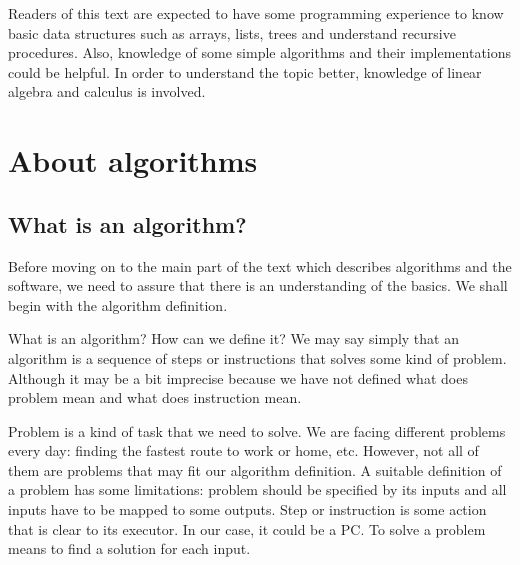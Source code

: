 \documentclass[
  field=inf,
  biblatex,
  language=english,
  glossaries,
  theorems=false,
  sourcecodes=false,
  index
]{kidiplom}
\begin{document}
Readers of this text are expected to have some programming experience to know basic data structures such as arrays, lists, trees and understand recursive procedures. Also, knowledge of some simple algorithms and their implementations could be helpful. In order to understand the topic better, knowledge of linear algebra and calculus is involved.

\newpage
\section{About algorithms}
\subsection{What is an algorithm?}

Before moving on to the main part of the text which describes algorithms and the software, we need to assure that there is an understanding of the basics. We shall begin with the algorithm definition.

What is an algorithm? How can we define it? We may say simply that an algorithm is a sequence of steps or instructions that solves some kind of problem. Although it may be a bit imprecise because we have not defined what does problem mean and what does instruction mean.

Problem is a kind of task that we need to solve. We are facing different problems every day: finding the fastest route to work or home, etc. However, not all of them are problems that may fit our algorithm definition. A suitable definition of a problem has some limitations: problem should be specified by its inputs and all inputs have to be mapped to some outputs. Step or instruction is some action that is clear to its executor. In our case, it could be a PC. To solve a problem means to find a solution for each input.
\end{document}
